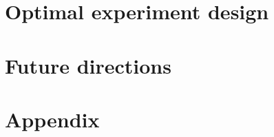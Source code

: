 \documentclass[a4paper, 10pt]{report}
\theoremstyle{plain}
\theoremstyle{definition}
\theoremstyle{remark}
\begin{document}
	\chapter{Optimal experiment design}
	\label{chap:oed}
	
	
	\chapter{Future directions}
	\label{chap:future}
	
	
	\chapter{Appendix}
	
	\clearpage %
	
	
	
	
\end{document}
